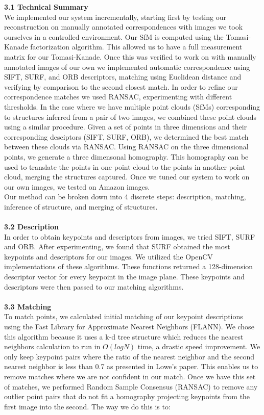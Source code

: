\documentclass[12pt]{article}
\begin{document}
\begin{multicols}{2}
{\large \textbf{3.1 Technical Summary}}\\
We implemented our system incrementally, starting first by testing our reconstruction on manually annotated correspondences with images we took ourselves in a controlled environment. Our SfM is computed using the Tomasi-Kanade factorization algorithm. This allowed us to have a full measurement matrix for our Tomasi-Kanade. Once this was verified to work on with manually annotated images of our own we implemented automatic correspondence using SIFT, SURF, and ORB descriptors, matching using Euclidean distance and verifying by comparison to the second closest match. In order to refine our correspondence matches we used RANSAC, experimenting with different thresholds. In the case where we have multiple point clouds (SfMs) corresponding to structures inferred from a pair of two images, we combined these point clouds using a similar procedure. Given a set of points in three dimensions and their corresponding desciptors (SIFT, SURF, ORB), we determined the best match between these clouds via RANSAC. Using RANSAC on the three dimensional points, we generate a three dimensonal homography. This homography can be used to translate the points in one point cloud to the points in another point cloud, merging the structures captured. Once we tuned our system to work on our own images, we tested on Amazon images. \\
\indent Our method can be broken down into 4 discrete steps: description, matching, inference of structure, and merging of structures. \\\\
{\large \textbf{3.2 Description}}\\
In order to obtain keypoints and descriptors from images, we tried SIFT, SURF and ORB. After experimenting, we found that SURF obtained the most keypoints and descriptors for our images. We utilized the OpenCV implementations of these algorithms. These functions returned a 128-dimension descriptor vector for every keypoint in the image plane. These keypoints and descriptors were then passed to our matching algorithms.\\\\
{\large \textbf{3.3 Matching}}\\
To match points, we calculated initial matching of our keypoint descriptions using the Fast Library for Approximate Nearest Neighbors (FLANN). We chose this algorithm because it uses a k-d tree structure which reduces the nearest neighbors calculation to run in $O(logN)$ time, a drastic speed improvement. We only keep keypoint pairs where the ratio of the nearest neighbor and the second nearest neighbor is less than 0.7 as presented in Lowe's paper. This enables us to remove matches where we are not confident in our match. Once we have this set of matches, we performed Random Sample Consensus (RANSAC) to remove any outlier point pairs that do not fit a homography projecting keypoints from the first image into the second. The way we do this is to:\\\\

\end{multicols}
\end{document}
